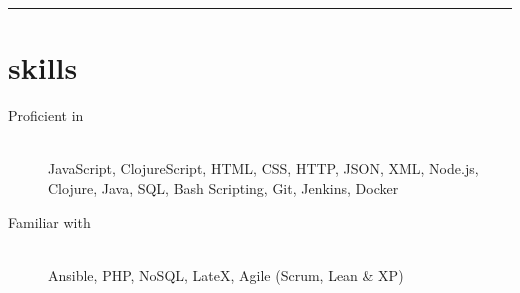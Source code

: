 \begin{samepage}
  \hrule
  \section*{skills}
\end{samepage}


\begin{description}
\item[Proficient in] \hfill \\ JavaScript, ClojureScript, HTML, CSS, HTTP, JSON,
  XML, Node.js, Clojure, Java, SQL, Bash Scripting, Git, Jenkins, Docker
\item[Familiar with] \hfill \\ Ansible, PHP, NoSQL, LateX, Agile (Scrum, Lean \&
  XP)
\end{description}
